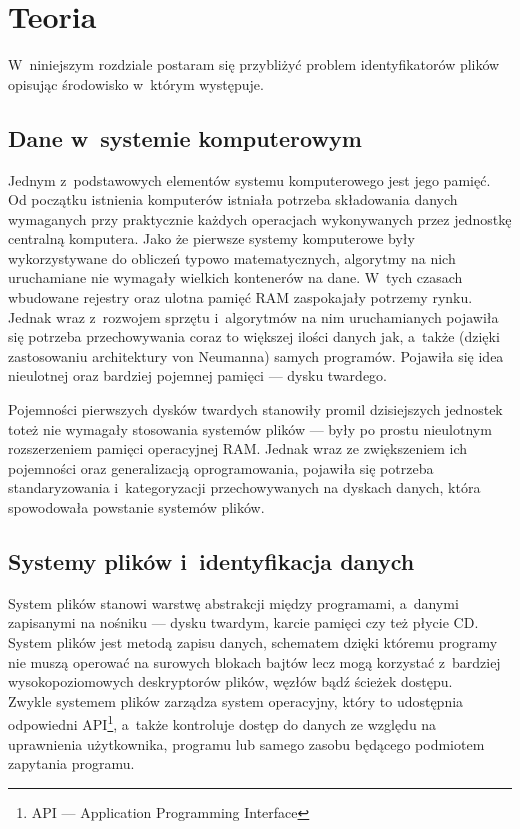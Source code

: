 \chapter{Teoria}
\label{teoria}
\par
W~niniejszym rozdziale postaram się przybliżyć problem identyfikatorów plików opisując środowisko w~którym występuje.

\section{Dane w~systemie komputerowym}
\par
Jednym z~podstawowych elementów systemu komputerowego jest jego pamięć. Od początku istnienia komputerów istniała potrzeba składowania danych wymaganych przy praktycznie każdych operacjach wykonywanych przez jednostkę centralną komputera. Jako że pierwsze systemy komputerowe były wykorzystywane do obliczeń typowo matematycznych, algorytmy na nich uruchamiane nie wymagały wielkich kontenerów na dane. W~tych czasach wbudowane rejestry oraz ulotna pamięć RAM zaspokajały potrzemy rynku. Jednak wraz z~rozwojem sprzętu i~algorytmów na nim uruchamianych pojawiła się potrzeba przechowywania coraz to większej ilości danych jak, a~także (dzięki zastosowaniu architektury von Neumanna) samych programów. Pojawiła się idea nieulotnej oraz bardziej pojemnej pamięci --- dysku twardego.\\

\par
Pojemności pierwszych dysków twardych stanowiły promil dzisiejszych jednostek toteż nie wymagały stosowania systemów plików --- były po prostu nieulotnym rozszerzeniem pamięci operacyjnej RAM. Jednak wraz ze zwiększeniem ich pojemności oraz generalizacją oprogramowania, pojawiła się potrzeba standaryzowania i~kategoryzacji przechowywanych na dyskach danych, która spowodowała powstanie systemów plików.

\section{Systemy plików i~identyfikacja danych}
\par
System plików stanowi warstwę abstrakcji między programami, a~danymi zapisanymi na nośniku --- dysku twardym, karcie pamięci czy też płycie CD. System plików jest metodą zapisu danych, schematem dzięki któremu programy nie muszą operować na surowych blokach bajtów lecz mogą korzystać z~bardziej wysokopoziomowych deskryptorów plików, węzłów bądź ścieżek dostępu.\\
Zwykle systemem plików zarządza system operacyjny, który to udostępnia odpowiedni API\footnote{API --- Application Programming Interface}, a~także kontroluje dostęp do danych ze względu na uprawnienia użytkownika, programu lub samego zasobu będącego podmiotem zapytania programu.\\

